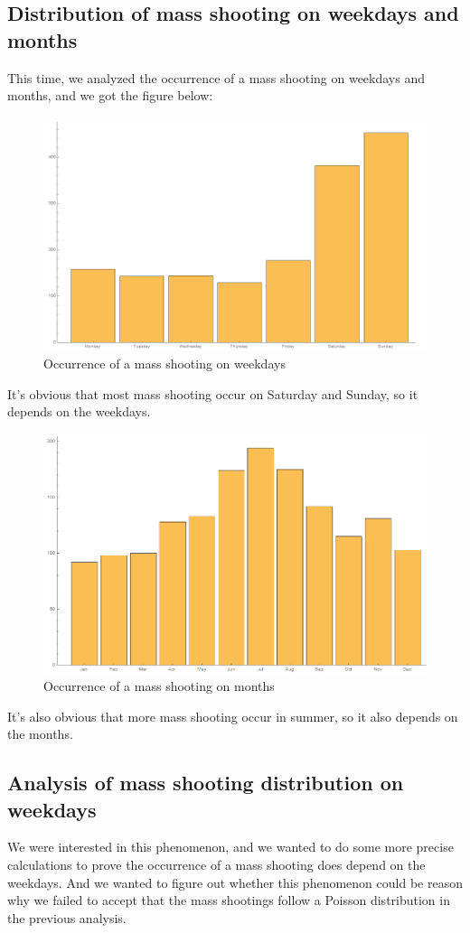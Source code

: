 \documentclass[12pt]{article}
\begin{document}
\subsection{Distribution of mass shooting on weekdays and months}
This time, we analyzed the occurrence of a mass shooting on weekdays and months, and we got the figure below:\\
\begin{figure}[H]
\centering
\includegraphics[scale=0.35]{Q4W.jpg}
\caption{Occurrence of a mass shooting on weekdays}
\end{figure}
It's obvious that most mass shooting occur on Saturday and Sunday, so it depends on the weekdays.
\begin{figure}[H]
\centering
\includegraphics[scale=0.35]{Q4M.jpg}
\caption{Occurrence of a mass shooting on months}
\end{figure}
It's also obvious that more mass shooting occur in summer, so it also depends on the months.
\subsection{Analysis of mass shooting distribution on weekdays}
We were interested in this phenomenon, and we wanted to do some more precise calculations to prove the occurrence of a mass shooting does depend on the weekdays. And we wanted to figure out whether this phenomenon could be reason why we failed to accept that the mass shootings follow a Poisson distribution in the previous analysis.
\end{document}
